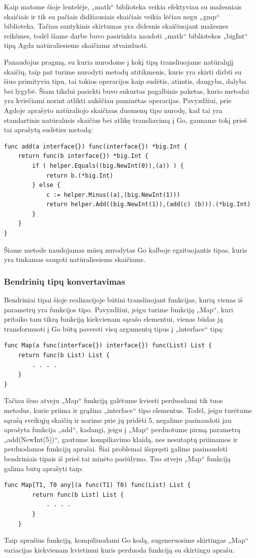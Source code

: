 \documentclass{VUMIFPSbakalaurinis}
\begin{document}
	Kaip matome šioje lentelėje, „math“ biblioteka veikia efektyviau su mažesniais skaičiais ir tik su pačiais didžiausiais skaičiais veikia lėčiau negu „gmp“ biblioteka. Tačiau santykinis skirtumas yra didesnis skaičiuojant mažesnes reikšmes, todėl šiame darbe buvo pasirinkta naudoti „math“ bibliotekos „bigInt“ tipą Agda natūraliesiems skaičiams atvaizduoti.
\par Panaudojus pragmą, su kuria nurodome į kokį tipą transliuojame natūralųjį skaičių, taip pat turime nurodyti metodų atitikmenis, kurie yra skirti dirbti su šiuo primityviu tipu, tai tokios operacijos kaip sudėtis, atimtis, daugyba, dalyba bei lygybė. Šiam tikslui pasiekti buvo sukurtas pagalbinis paketas, kurio metodai yra kviečiami norint atlikti aukščiau paminėtas operacijas. Pavyzdžiui, prie Agdoje aprašyto natūraliojo skaičiaus duomenų tipo nurodę, kad tai yra standartinis natūralusis skaičius bei atlikę transliavimą į Go, gauname tokį prieš tai aprašytą sudėties metodą:
\begin{lstlisting}[language=GoCust]
func add(a interface{}) func(interface{}) *big.Int {
	return func(b interface{}) *big.Int {
 		if ( helper.Equals((big.NewInt(0)),(a)) ) {
 			return b.(*big.Int) 
		} else {
 			c := helper.Minus((a),(big.NewInt(1))) 
 			return helper.Add((big.NewInt(1)),(add(c) (b))).(*big.Int) 
		}
 	}
}
\end{lstlisting}
Šiame metode naudojamas mūsų nurodytas Go kalboje egzituojantis tipas, kuris yra tinkamas saugoti natūraliesiems skaičiams.
\subsubsection{Bendrinių tipų konvertavimas}
Bendriniai tipai šioje realizacijoje būtini transliuojant funkcijas, kurių vienas iš parametrų yra funkcijos tipo. Pavyzdžiui, jeigu turime funkciją „Map“, kuri pritaiko tam tikrą funkciją kiekvienam sąrašo elementui, vienas būdas ją transformuoti į Go būtų paversti visų argumentų tipus į „interface{}“ tipą:
\begin{lstlisting}[language=GoCust]
func Map(a func(interface{}) interface{}) func(List) List {
	return func(b List) List {
		. . . .
	}
}
\end{lstlisting}
Tačiau šiuo atveju „Map“ funkciją galėtume kviesti perduodami tik tuos metodus, kurie priima ir grąžina „interface{}“ tipo elementus. Todėl, jeigu turėtume sąrašą sveikųjų skaičių ir norime prie jų pridėti 5, negalime pasinaudoti jau aprašyta funkcija „add“, kadangi, jeigu į „Map“ perduotume pirmą parametrą „add(NewInt(5))“, gautume kompiliavimo klaidą, nes nesutaptų priimamos ir perduodamos funkcijų aprašai. Šiai problemai išspręsti galime pasinaudoti bendriniais tipais iš prieš tai minėto pasiūlymo. Tuo atveju „Map“ funkciją galima būtų aprašyti taip:
\begin{lstlisting}[language=GoCust]
	func Map[T1, T0 any](a func(T1) T0) func(List) List {
		return func(b List) List {
			. . . .
		}
	}
	\end{lstlisting}
Taip aprašius funkciją, kompiliuodami Go kodą, sugeneruosime skirtingas „Map“ variacijas kiekvienam kvietimui kuris perduoda funkciją su skirtingu aprašu.
\end{document}
